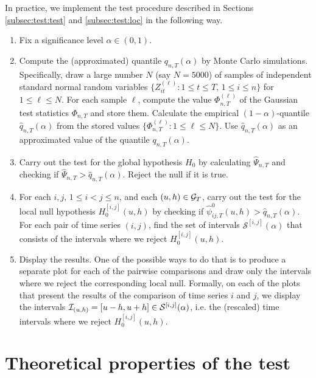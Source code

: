 \documentclass[a4paper,12pt]{article}
\begin{document}
In practice, we implement the test procedure described in Sections \ref{subsec:test:test} and \ref{subsec:test:loc} in the following way. 
\begin{enumerate}[label=\textit{Step \arabic*.}, leftmargin=1.45cm]
\item Fix a significance level $\alpha \in (0, 1)$. 
\item Compute the (approximated) quantile $q_{n, T}(\alpha)$ by Monte Carlo simulations. Specifically, draw a large number $N$ (say $N=5000$) of samples of independent standard normal random variables $\{Z_{it}^{(\ell)} : 1 \le t \le T, \, 1 \le i \le n \}$ for $1 \le \ell \le N$. For each sample $\ell$, compute the value $\Phi_{n,T}^{(\ell)}$ of the Gaussian test statistics $\Phi_{n, T}$ and store them. Calculate the empirical $(1-\alpha)$-quantile $\hat{q}_{n, T}(\alpha)$ from the stored values $\{ \Phi_{n, T}^{(\ell)}: 1 \le \ell \le N \}$. Use $\hat{q}_{n, T}(\alpha)$ as an approximated value of the quantile $q_{n, T}(\alpha)$.
\item Carry out the test for the global hypothesis $H_0$ by calculating $\widehat{\Psi}_{n, T}$ and checking if {\color{red}$\widehat{\Psi}_{n, T} > \hat{q}_{n, T}(\alpha)$}. Reject the null if it is true.
\item For each $i, j,\, 1 \le i < j \le n$, and each $(u, h) \in \mathcal{G}_T$, carry out the test for the local null hypothesis $H_0^{[i, j]}(u, h)$ by checking if {\color{red}$\hat{\psi}^0_{ij, T}(u, h)> \hat{q}_{n, T}(\alpha)$}. For each pair of time series $(i, j)$, find the set of intervals $\mathcal{S}^{[i, j]}(\alpha)$ that consists of the intervals where we reject $H_0^{[i,j]}(u,h)$. 
\item Display the results. One of the possible ways to do that is to produce a separate plot for each of the pairwise comparisons and draw only the intervals where we reject the corresponding local null. Formally, on each of the plots that present the results of the comparison of time series $i$ and $j$, we display the intervals $\mathcal{I}_{(u, h)} = [u- h, u+h] \in \mathcal{S}^{[i, j]}(\alpha)$, i.e. the (rescaled) time intervals where we reject $H_0^{[i, j]}(u, h)$. 
\end{enumerate}


\section{Theoretical properties of the test}\label{sec:theo}
\end{document}
